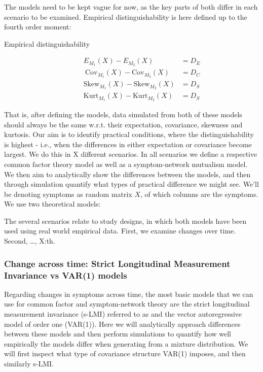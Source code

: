\documentclass[
  letterpaper,
  DIV=11,
  numbers=noendperiod]{scrartcl}
\begin{document}
The models need to be kept vague for now, as the key parts of both
differ in each scenario to be examined. Empirical distinguishability is
here defined up to the fourth order moment:

\begin{description}
\item[Empirical distinguishability]
\[\begin{aligned} E_{M_1}(X)-E_{M_2}(X)&=D_E\\\   \text{Cov} _{M_1}(X)-\text{Cov} _{M_2}(X)&=D_C  \\   \text{Skew} _{M_1}(X)-\text{Skew} _{M_2}(X)&=D_S\\   \text{Kurt} _{M_1}(X)-\text{Kurt} _{M_2}(X)&=D_S   \end{aligned}  \]
\end{description}

That is, after defining the models, data simulated from both of these
models should always be the same w.r.t. their expectation, covariance,
skewness and kurtosis. Our aim is to identify practical conditions,
where the distinguishability is highest - i.e., when the differences in
either expectation or covariance become largest. We do this in X
different scenarios. In all scenarios we define a respective common
factor theory model as well as a symptom-network mutualism model. We
then aim to analytically show the differences between the models, and
then through simulation quantify what types of practical difference we
might see. We'll be denoting symptoms as random matrix \(X\), of which
columns are the symptoms. We use two theoretical models:

The several scenarios relate to study designs, in which both models have
been used using real world empirical data. First, we examine changes
over time. Second, \ldots, X:th.

\hypertarget{change-across-time-strict-longitudinal-measurement-invariance-vs-var1-models}{%
\subsubsection{Change across time: Strict Longitudinal Measurement
Invariance vs VAR(1)
models}\label{change-across-time-strict-longitudinal-measurement-invariance-vs-var1-models}}

Regarding changes in symptoms across time, the most basic models that we
can use for common factor and symptom-network theory are the strict
longitudinal measurement invariance (s-LMI) referred to as and the
vector autoregressive model of order one (VAR(1)). Here we will
analytically approach differences between these models and then perform
simulations to quantify how well empirically the models differ when
generating from a mixture distribution. We will first inspect what type
of covariance structure VAR(1) imposes, and then similarly s-LMI.
\end{document}
